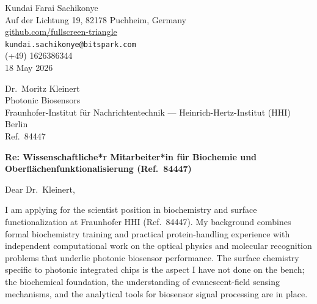 \documentclass[12pt,a4paper]{article}
\begin{document}
\begin{flushright}
Kundai Farai Sachikonye \\
Auf der Lichtung 19, 82178 Puchheim, Germany \\
\href{https://github.com/fullscreen-triangle}{github.com/fullscreen-triangle} \\
\texttt{kundai.sachikonye@bitspark.com} \\
(+49) 1626386344 \\[6pt]
18 May 2026
\end{flushright}

\vspace{1em}

Dr.\ Moritz Kleinert \\
Photonic Biosensors \\
Fraunhofer-Institut für Nachrichtentechnik --- Heinrich-Hertz-Institut (HHI) \\
Berlin \\
Ref.\ 84447

\vspace{1.5em}

\textbf{Re: Wissenschaftliche*r Mitarbeiter*in für Biochemie und Oberflächenfunktionalisierung (Ref.\ 84447)}

\vspace{1em}

Dear Dr.\ Kleinert,

I am applying for the scientist position in biochemistry and surface
functionalization at Fraunhofer HHI (Ref.\ 84447).
My background combines formal biochemistry training and practical
protein-handling experience with independent computational work on the
optical physics and molecular recognition problems that underlie photonic
biosensor performance.
The surface chemistry specific to photonic integrated chips is the aspect
I have not done on the bench; the biochemical foundation, the understanding
of evanescent-field sensing mechanisms, and the analytical tools for
biosensor signal processing are in place.
\end{document}
